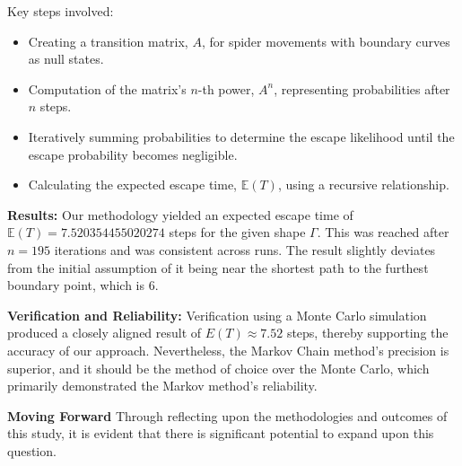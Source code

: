 \documentclass[12pt,a4paper]{article}
\begin{document}
Key steps involved:
\begin{itemize}
    \item Creating a transition matrix, \(A\), for spider movements with boundary curves as null states.
    \item Computation of the matrix's \(n\)-th power, \(A^n\), representing probabilities after \(n\) steps.
    \item Iteratively summing probabilities to determine the escape likelihood until the escape probability becomes negligible.
    \item Calculating the expected escape time, \(\mathbb{E}(T)\), using a recursive relationship.
\end{itemize}

\textbf{Results:}
Our methodology yielded an expected escape time of \(\mathbb{E}(T) = 7.520354455020274\) steps for the given shape \(\Gamma\). This was reached after \(n = 195\) iterations and was consistent across runs. The result slightly deviates from the initial assumption of it being near the shortest path to the furthest boundary point, which is 6.

\textbf{Verification and Reliability:}
Verification using a Monte Carlo simulation produced a closely aligned result of \(E(T) \approx 7.52\) steps, thereby supporting the accuracy of our approach. Nevertheless, the Markov Chain method's precision is superior, and it should be the method of choice over the Monte Carlo, which primarily demonstrated the Markov method's reliability.

\textbf{Moving Forward}
Through reflecting upon the methodologies and outcomes of this study, it is evident that there is significant potential to expand upon this question. 
\end{document}
